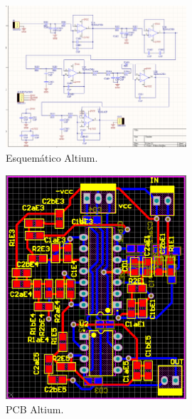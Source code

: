  \begin{figure}[H]
	\centering
	\includegraphics[width=0.6\textwidth]{ImagenesEjercicio2/altiumesq.PNG}
\caption{Esquemático Altium.}
	\label{fig:altiumesq}
\end{figure}
 \begin{figure}[H]
	\centering
	\includegraphics[width=0.6\textwidth]{ImagenesEjercicio2/altiumpcb.PNG}
\caption{PCB Altium.}
	\label{fig:altiumpcb}
\end{figure}
